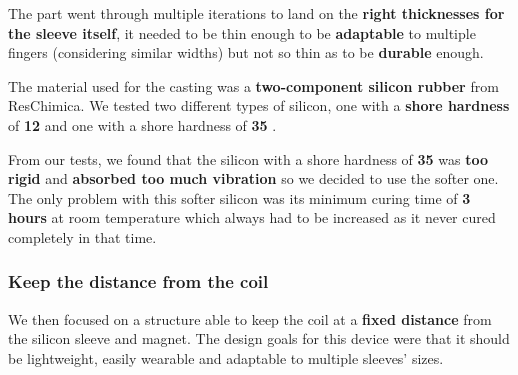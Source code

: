 The part went through multiple iterations to land on the \textbf{right thicknesses for the sleeve itself}, it needed to be thin enough to be \textbf{adaptable} to multiple fingers (considering similar widths) but not so thin as to be \textbf{durable} enough.

The material used for the casting was a \textbf{two-component silicon rubber} from ResChimica.
We tested two different types of silicon, one with a \textbf{shore hardness} of \textbf{12} \cite{R_Pro_10_silicon} and one with a shore hardness of \textbf{35} \cite{R_Pro_Fast_silicon}.

From our tests, we found that the silicon with a shore hardness of \textbf{35} was \textbf{too rigid} and \textbf{absorbed too much vibration} so we decided to use the softer one.
The only problem with this softer silicon was its minimum curing time of \textbf{3 hours} at room temperature which always had to be increased as it never cured completely in that time.

\subsubsection{Keep the distance from the coil}
We then focused on a structure able to keep the coil at a \textbf{fixed distance} from the silicon sleeve and magnet.
The design goals for this device were that it should be lightweight, easily wearable and adaptable to multiple sleeves' sizes.


